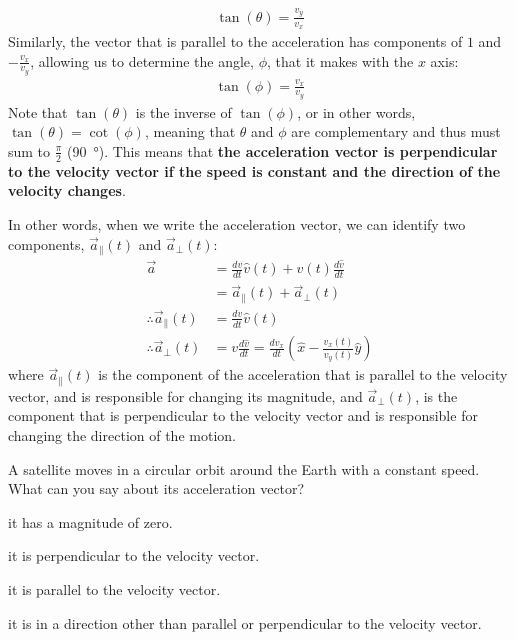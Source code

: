 \begin{align*}
\tan(\theta)=\frac{v_y}{v_x}
\end{align*}
Similarly, the vector that is parallel to the acceleration has components of $1$ and $-\frac{v_x}{v_y}$, allowing us to determine the angle, $\phi$, that it makes with the $x$ axis:
\begin{align*}
\tan(\phi)=\frac{v_x}{v_y}
\end{align*}
Note that $\tan(\theta)$ is the inverse of $\tan(\phi)$, or in other words, $\tan(\theta)=\cot(\phi)$, meaning that $\theta$ and $\phi$ are complementary and thus must sum to $\frac{\pi}{2}$ (\SI{90}{\degree}). This means that \textbf{the acceleration vector is perpendicular to the velocity vector if the speed is constant and the direction of the velocity changes}. 

In other words, when we write the acceleration vector, we can identify two components, $\vec a_{\parallel}(t)$ and $\vec a_{\perp}(t)$:
\begin{align*}
\vec a&=\frac{dv}{dt}\hat v(t)+v(t)\frac{d\hat v}{dt}\\
&=\vec a_{\parallel}(t) + \vec a_{\perp}(t)\\
\therefore \vec a_{\parallel}(t)&=\frac{dv}{dt}\hat v(t)\\
\therefore \vec a_{\perp}(t)&=v\frac{d\hat v}{dt}=\frac{dv_x}{dt} \left(\hat x - \frac{v_x(t)}{v_y(t)}\hat y\right)
\end{align*}
where $\vec a_{\parallel}(t)$ is the component of the acceleration that is parallel to the velocity vector, and is responsible for changing its magnitude, and $\vec a_{\perp}(t)$, is the component that is perpendicular to the velocity vector and is responsible for changing the direction of the motion.

\begin{checkpoint}{\begin{MCquestion}{A satellite moves in a circular orbit around the Earth with a constant speed. What can you say about its acceleration vector?}
\item it has a magnitude of zero.
\item it is perpendicular to the velocity vector.
\item it is parallel to the velocity vector.
\item it is in a direction other than parallel or perpendicular to the velocity vector.
\end{MCquestion}}
\end{checkpoint}

